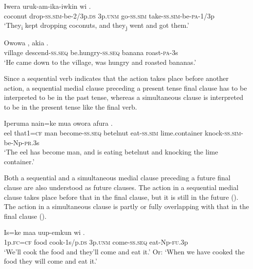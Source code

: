 \ea%
\label{ex:x1025}
\gll Iwera uruk-am-ika-iwkin wi  .\\
coconut drop-\textsc{ss}.\textsc{sim}-be-2/3p.\textsc{ds} 3p.\textsc{unm} go-\textsc{ss}.\textsc{sim} take-\textsc{ss}.\textsc{sim}-be-\textsc{pa}-1/3p\\
\glt`They\textsubscript{i} kept dropping coconuts, and they\textsubscript{j} went and got them.'
\z

\ea%
\label{ex:x1023}
\gll Owowa  , akia . \\
village descend-\textsc{ss}.\textsc{seq} be.hungry-\textsc{ss}.\textsc{seq} banana roast-\textsc{pa}-3s\\
\glt`He came down to the village, was hungry and roasted bananas.'
\z

Since a sequential verb indicates that the action takes place before another action, a sequential medial clause preceding a present tense final clause has to be interpreted to be in the past tense, whereas a simultaneous clause is interpreted to be in the present tense like the final verb.

\ea%
\label{ex:x1024}
\gll Iperuma nain=ke mua  owora  afura .\\
eel that1=\textsc{cf} man become-\textsc{ss}.\textsc{seq} betelnut eat-\textsc{ss}.\textsc{sim} lime.container knock-\textsc{ss}.\textsc{sim}-be-Np-\textsc{pr}.3s\\
\glt`The eel has become man, and is eating betelnut and knocking the lime container.'
\z

Both a sequential and a simultaneous medial clause preceding a future final clause are also understood as future clauses. The action in a sequential medial clause takes place before that in the final clause, but it is still in the future (). The action in a simultaneous clause is partly or fully overlapping with that in the final clause ().

\ea%
\label{ex:x1026}
\gll Is=ke maa uup-emkun wi  . \\
1p.\textsc{fc}=\textsc{cf} food cook-1s/p.\textsc{ds} 3p.\textsc{unm} come-\textsc{ss}.\textsc{seq} eat-Np-\textsc{fu}.3p\\
\glt`We'll cook the food and they'll come and eat it.' Or: `When we have cooked the food they will come and eat it.'
\z

